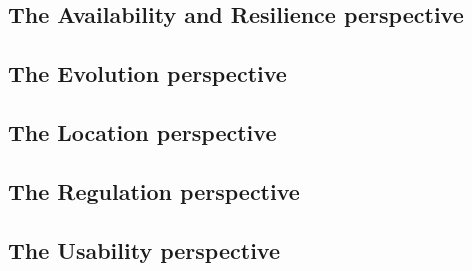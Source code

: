 \subsection*{The Availability and Resilience perspective}


\subsection*{The Evolution perspective}


\subsection*{The Location perspective}


\subsection*{The Regulation perspective}


\subsection*{The Usability perspective}
